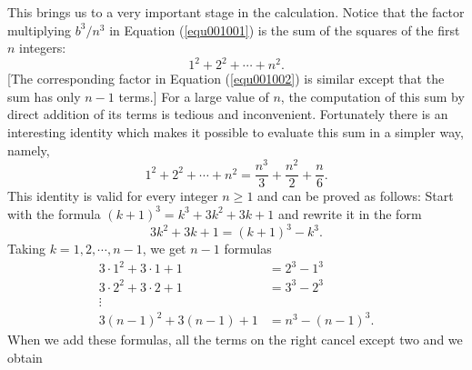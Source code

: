 \documentclass[cn,11pt,chinese]{elegantbook}
\numberwithin{equation}{section}
\begin{document}
This brings us to a very important stage in the calculation. Notice that the factor multiplying $b^3/n^3$ in Equation (\ref{equ001001}) is the sum of the squares of the first $n$ integers:
\[
1^2 + 2^2 + \cdots + n^2.
\]
[The corresponding factor in Equation (\ref{equ001002}) is similar except that the sum has only $n-1$ terms.] For a large value of $n$, the computation of this sum by direct addition of its terms is tedious and inconvenient. Fortunately there is an interesting identity which makes it possible to evaluate this sum in a simpler way, namely,
\begin{equation}\label{equ001003}
1^2 + 2^2 + \cdots + n^2 = \frac{n^3}{3} + \frac{n^2}{2} + \frac{n}{6}.
\end{equation}
This identity is valid for every integer $n \ge 1$ and can be proved as follows: Start with the formula $(k+1)^3= k^3 + 3k^2 + 3k + 1$ and rewrite it in the form
\[
3k^2 + 3k + 1 = (k+1)^3 - k^3. 
\]
Taking $k=1,2,\cdots, n-1$, we get $n-1$ formulas
\[
\begin{aligned}
3 \cdot 1^2 + 3 \cdot 1 + 1 &= 2^3 - 1^3\\
3 \cdot 2^2 + 3 \cdot 2 + 1 &= 3^3 - 2^3\\
\vdots&\\
3(n-1)^2 + 3(n-1) + 1 &= n^3 - (n-1)^3.
\end{aligned}
\]
When we add these formulas, all the terms on the right cancel except two and we obtain











% 

\appendix
\end{document}
